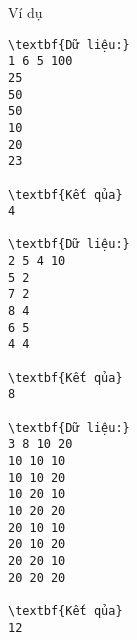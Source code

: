 Ví dụ
\begin{verbatim}
\textbf{Dữ liệu:}
1 6 5 100
25
50
50
10
20
23

\textbf{Kết qủa}
4

\textbf{Dữ liệu:}
2 5 4 10
5 2
7 2
8 4
6 5
4 4

\textbf{Kết qủa}
8

\textbf{Dữ liệu:}
3 8 10 20
10 10 10
10 10 20
10 20 10
10 20 20
20 10 10
20 10 20
20 20 10
20 20 20

\textbf{Kết qủa}
12
\end{verbatim}